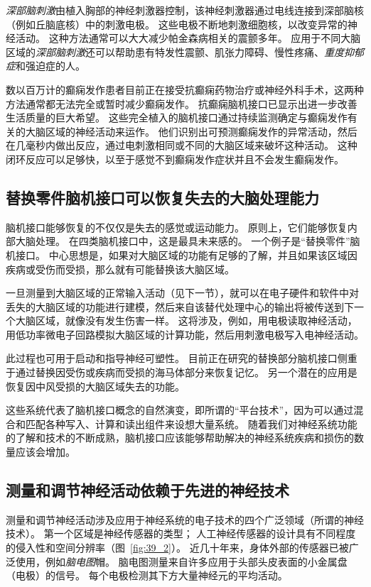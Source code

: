 \textit{深部脑刺激}由植入胸部的神经刺激器控制，该神经刺激器通过电线连接到深部脑核（例如丘脑底核）中的刺激电极。 
这些电极不断地刺激细胞核，以改变异常的神经活动。 
这种方法通常可以大大减少帕金森病相关的震颤多年。 
应用于不同大脑区域的\textit{深部脑刺激}还可以帮助患有特发性震颤、肌张力障碍、慢性疼痛、\textit{重度抑郁症}和强迫症的人。


数以百万计的癫痫发作患者目前正在接受抗癫痫药物治疗或神经外科手术，这两种方法通常都无法完全或暂时减少癫痫发作。
抗癫痫脑机接口已显示出进一步改善生活质量的巨大希望。 
这些完全植入的脑机接口通过持续监测确定与癫痫发作有关的大脑区域的神经活动来运作。 
他们识别出可预测癫痫发作的异常活动，然后在几毫秒内做出反应，通过电刺激相同或不同的大脑区域来破坏这种活动。 
这种闭环反应可以足够快，以至于感觉不到癫痫发作症状并且不会发生癫痫发作。



\subsection{替换零件脑机接口可以恢复失去的大脑处理能力}

脑机接口能够恢复的不仅仅是失去的感觉或运动能力。
原则上，它们能够恢复内部大脑处理。
在四类脑机接口中，这是最具未来感的。
一个例子是“替换零件”脑机接口。
中心思想是，如果对大脑区域的功能有足够的了解，并且如果该区域因疾病或受伤而受损，那么就有可能替换该大脑区域。


一旦测量到大脑区域的正常输入活动（见下一节），就可以在电子硬件和软件中对丢失的大脑区域的功能进行建模，然后来自该替代处理中心的输出将被传送到下一个大脑区域，就像没有发生伤害一样。
这将涉及，例如，用电极读取神经活动，用低功率微电子回路模拟大脑区域的计算功能，然后用刺激电极写入电神经活动。


此过程也可用于启动和指导神经可塑性。
目前正在研究的替换部分脑机接口侧重于通过替换因受伤或疾病而受损的海马体部分来恢复记忆。
另一个潜在的应用是恢复因中风受损的大脑区域失去的功能。


这些系统代表了脑机接口概念的自然演变，即所谓的“平台技术”，因为可以通过混合和匹配各种写入、计算和读出组件来设想大量系统。
随着我们对神经系统功能的了解和技术的不断成熟，脑机接口应该能够帮助解决的神经系统疾病和损伤的数量应该会增加。



\subsection{测量和调节神经活动依赖于先进的神经技术}

测量和调节神经活动涉及应用于神经系统的电子技术的四个广泛领域（所谓的神经技术）。
第一个区域是神经传感器的类型；
人工神经传感器的设计具有不同程度的侵入性和空间分辨率（图~\ref{fig:39_2}）。
近几十年来，身体外部的传感器已被广泛使用，例如\textit{脑电图}帽。
脑电图测量来自许多应用于头部头皮表面的小金属盘（电极）的信号。
每个电极检测其下方大量神经元的平均活动。


